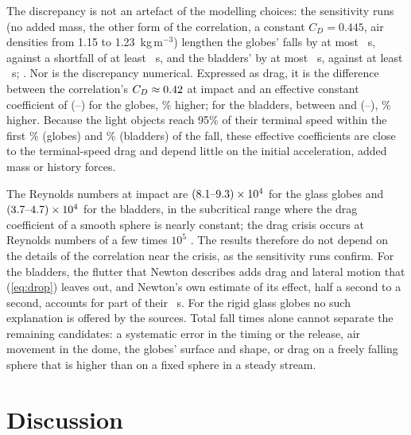 \documentclass{jfm}
\begin{document}
The discrepancy is not an artefact of the modelling choices: the sensitivity runs (no added mass, the other form
of the correlation, a constant $C_D = 0.445$, air densities from 1.15 to 1.23~kg\,m$^{-3}$) lengthen the
globes' falls by at most \GlobeSensUp~s, against a shortfall of at least \GlobeMinDeficit~s, and the bladders'
by at most \BladderSensUp~s, against at least \BladderMinDeficit~s; \SensReachedText. Nor is the discrepancy
numerical. Expressed as drag, it is the difference between
the correlation's $C_D \approx 0.42$ at impact and an effective constant coefficient of \GlobeCdEff{}
(\GlobeCdEffMin--\GlobeCdEffMax) for the globes, \GlobeCdRatio\% higher; for the bladders, between
\BladderCdModel{} and \BladderCdEff{} (\BladderCdEffMin--\BladderCdEffMax), \BladderCdRatio\% higher.
Because the light objects reach 95\% of their terminal speed within the first \GlobeTninetyFive\% (globes) and
\BladderTninetyFive\% (bladders) of the fall, these effective coefficients are close to the terminal-speed drag
and depend little on the initial acceleration, added mass or history forces.

The Reynolds numbers at impact are $(8.1\text{--}9.3)\times10^4$ for the glass globes and
$(3.7\text{--}4.7)\times10^4$ for the bladders, in the subcritical range where the drag
coefficient of a smooth sphere is nearly constant; the drag crisis occurs at Reynolds numbers of a few times
$10^5$ \citep{Achenbach1972}. The results therefore do not depend on the details of the correlation near the
crisis, as the sensitivity runs confirm. For the bladders, the flutter that Newton describes adds drag and
lateral motion that (\ref{eq:drop}) leaves out, and Newton's own estimate of its effect, half a second to a
second, accounts for part of their \BladderMeanErr~s. For the rigid glass globes no such explanation is offered by
the sources. Total fall times alone cannot separate the remaining candidates: a systematic error in the timing or
the release, air movement in the dome, the globes' surface and shape, or drag on a freely falling sphere that is
higher than on a fixed sphere in a steady stream.

\section{Discussion}\label{sec:discussion}
\end{document}
